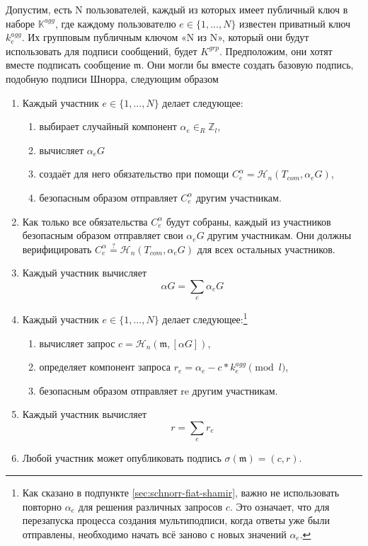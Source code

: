 Допустим, есть N пользователей, каждый из которых имеет публичный ключ в наборе $\mathbb{K}^{agg}$, где каждому пользователю $e \in \{1,...,N\}$ известен приватный ключ $k^{agg}_e$. Их групповым публичным ключом «N из N», который они будут использовать для подписи сообщений, будет $K^{grp}$. Предположим, они хотят вместе подписать сообщение $\mathfrak{m}$. Они могли бы вместе создать базовую подпись, подобную подписи Шнорра, следующим образом
\begin{enumerate}
    \item Каждый участник $e \in \{1,...,N\}$ делает следующее:
    \begin{enumerate}
        \item выбирает случайный компонент $\alpha_e \in_R \mathbb{Z}_l$,
        \item вычисляет $\alpha_e G$
        \item создаёт для него обязательство при помощи $C^{\alpha}_e = \mathcal{H}_n(T_{com},\alpha_e G)$,
        \item безопасным образом отправляет $C^{\alpha}_e$ другим участникам.
    \end{enumerate}
    \item Как только все обязательства $C^{\alpha}_e$ будут собраны, каждый из участников безопасным образом отправляет свои $\alpha_e G$ другим участникам. Они должны верифицировать $C^{\alpha}_e \stackrel{?}{=} \mathcal{H}_n(T_{com},\alpha_e G)$ для всех остальных участников.
    \item Каждый участник вычисляет
    \[ \alpha G = \sum_e \alpha_e G \]
    \item Каждый участник $e \in \{1,...,N\}$ делает следующее:\footnote{Как сказано в подпункте \ref{sec:schnorr-fiat-shamir}, важно не использовать повторно $\alpha_e$ для решения различных запросов $c$. Это означает, что для перезапуска процесса создания мультиподписи, когда ответы уже были отправлены, необходимо начать всё заново с новых значений $\alpha_e$.}
    \begin{enumerate}
        \item вычисляет запрос $c = \mathcal{H}_n(\mathfrak{m},[\alpha G])$,
        \item определяет компонент запроса $r_e = \alpha_e - c* k^{agg}_e \pmod l$,
        \item безопасным образом отправляет re другим участникам.
    \end{enumerate}
    \item Каждый участник вычисляет 
    \[ r = \sum_e r_e\]
    \item Любой участник может опубликовать подпись $\sigma(\mathfrak{m}) = (c,r)$.
\end{enumerate}


